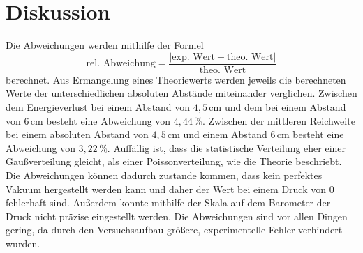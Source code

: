\section{Diskussion}
\label{sec:Diskussion}
Die Abweichungen werden mithilfe der Formel
\begin{equation*}
    \text{rel. Abweichung} = \frac{|\text{exp. Wert} - \text{theo. Wert}|}{\text{theo. Wert}}
  \end{equation*}
berechnet.
Aus Ermangelung eines Theoriewerts werden jeweils die berechneten Werte der unterschiedlichen absoluten Abstände miteinander verglichen. Zwischen dem Energieverlust 
bei einem Abstand von $4,5 \, \unit{\centi\meter}$ und dem bei einem Abstand von $6 \, \unit{\centi\meter}$ besteht eine Abweichung von $4,44 \, \%$. Zwischen 
der mittleren Reichweite bei einem absoluten Abstand von $4,5 \, \unit{\centi\meter}$ und einem Abstand $6 \, \unit{\centi\meter}$ besteht eine Abweichung von 
$3,22 \, \%$. Auffällig ist, dass die statistische Verteilung eher einer Gaußverteilung gleicht, als einer Poissonverteilung, wie die Theorie beschriebt. 
Die Abweichungen können dadurch zustande kommen, dass kein perfektes Vakuum hergestellt werden kann und daher der Wert bei einem Druck von $0$ fehlerhaft sind. 
Außerdem konnte mithilfe der Skala auf dem Barometer der Druck nicht präzise eingestellt werden. Die Abweichungen sind vor allen Dingen gering, da durch den 
Versuchsaufbau größere, experimentelle Fehler verhindert wurden. 
